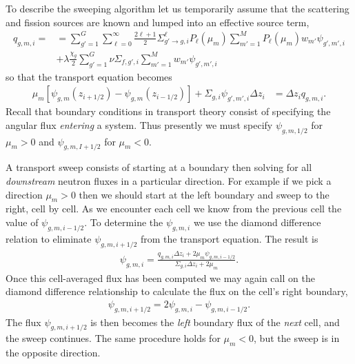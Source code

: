 \documentclass[11pt]{article}
\begin{document}
To describe the sweeping algorithm let us temporarily assume that the scattering and fission sources are known and lumped into an effective source term,
\begin{align}
  q_{g,m,i} = &= \sum_{g'=1}^G \sum_{\ell=0}^\infty \frac{2\ell+1}{2} \Sigma_{g' \rightarrow g,i}^\ell P_\ell(\mu_m) \sum_{m'=1}^M P_\ell(\mu_m) w_{m'} \psi_{g',m',i} \\
  &+ \lambda\frac{\chi_g}{2} \sum_{g'=1}^G \nu\Sigma_{f,g',i} \sum_{m'=1}^M w_{m'} \psi_{g',m',i}
\end{align}
so that the transport equation becomes
\begin{align}
  \mu_m \left[ \psi_{g,m}(z_{i+1/2}) - \psi_{g,m}(z_{i-1/2}) \right]
  + \Sigma_{g,i} \psi_{g',m',i} \Delta z_i
  &= \Delta z_i q_{g,m,i}.
\end{align}
Recall that boundary conditions in transport theory consist of specifying the angular flux \emph{entering} a system.  Thus presently we must specify \(\psi_{g,m,1/2}\) for \(\mu_m > 0\) and \(\psi_{g,m,I+1/2}\) for \(\mu_m<0\).

A transport sweep consists of starting at a boundary then solving for all \emph{downstream} neutron fluxes in a particular direction.  For example if we pick a direction \(\mu_m > 0\) then we should start at the left boundary and sweep to the right, cell by cell.  As we encounter each cell we know from the previous cell the value of \(\psi_{g,m,i-1/2}\).  To determine the \(\psi_{g,m,i}\) we use the diamond difference relation to eliminate \(\psi_{g,m,i+1/2}\) from the transport equation.  The result is
\begin{align}
  \psi_{g,m,i} = \frac{q_{g,m,i} \Delta z_i + 2 \mu_m \psi_{g,m,i-1/2}}{\Sigma_{g,i} \Delta z_i + 2 \mu_m}.
\end{align}
Once this cell-averaged flux has been computed we may again call on the diamond difference relationship to calculate the flux on the cell's right boundary,
\begin{align}
  \psi_{g,m,i+1/2} = 2 \psi_{g,m,i} - \psi_{g,m,i-1/2}.
\end{align}
The flux \(\psi_{g,m,i+1/2}\) is then becomes the \emph{left} boundary flux of the \emph{next} cell, and the sweep continues.  The same procedure holds for \(\mu_m < 0\), but the sweep is in the opposite direction.
\end{document}
